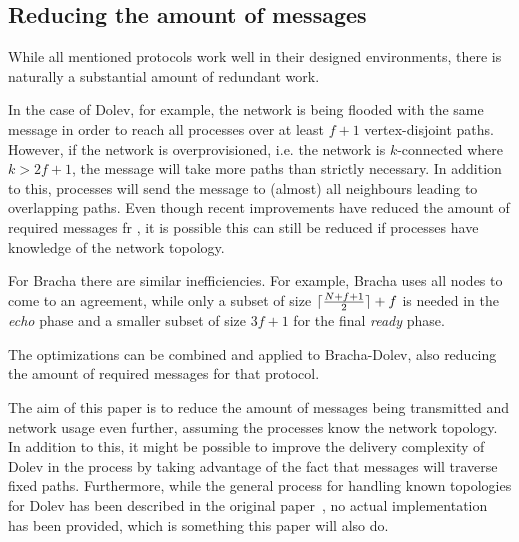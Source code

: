 \subsection*{Reducing the amount of messages}
While all mentioned protocols work well in their designed environments, there is naturally a substantial amount of redundant work.

In the case of Dolev, for example, the network is being flooded with the same message in order to reach all processes over at least $f+1$ vertex-disjoint paths. However, if the network is overprovisioned, i.e. the network is $k$-connected where $k > 2f+1$, the message will take more paths than strictly necessary. In addition to this, processes will send the message to (almost) all neighbours leading to overlapping paths. Even though recent improvements have reduced the amount of required messages 
fr%
, it is possible this can still be reduced if processes have knowledge of the network topology.

For Bracha there are similar inefficiencies. For example, Bracha uses all nodes to come to an agreement, while only a subset of size $\lceil\frac{N+f+1}{2}\rceil + f$ is needed in the \textit{echo} phase and a smaller subset of size $3f+1$ for the final \textit{ready} phase.

The optimizations can be combined and applied to Bracha-Dolev, also reducing the amount of required messages for that protocol.

The aim of this paper is to reduce the amount of messages being transmitted and network usage even further, assuming the processes know the network topology. In addition to this, it might be possible to improve the delivery complexity of Dolev in the process by taking advantage of the fact that messages will traverse fixed paths. Furthermore, while the general process for handling known topologies for Dolev has been described in the original paper~\cite{dolev}, no actual implementation has been provided, which is something this paper will also do.